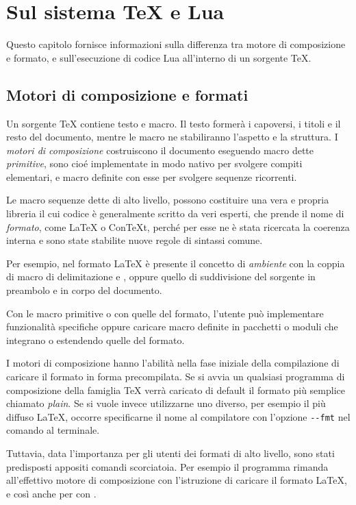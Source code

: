 

\chapter{Sul sistema \TeX{} e Lua}
\label{iichExplain}

Questo capitolo fornisce informazioni sulla differenza tra motore di
composizione e formato, e sull'esecuzione di codice Lua all'interno di un
sorgente \TeX.


\section{Motori di composizione e formati}

Un sorgente \TeX{} contiene testo e macro. Il testo formerà i capoversi, i
titoli e il resto del documento, mentre le macro ne stabiliranno l'aspetto e la
struttura. I \emph{motori di composizione} costruiscono il documento eseguendo
macro dette \emph{primitive}, sono cioé implementate in modo nativo per svolgere
compiti elementari, e macro definite con esse per svolgere sequenze ricorrenti.

Le macro sequenze dette di alto livello, possono costituire una vera e propria
libreria il cui codice è generalmente scritto da veri esperti, che prende il
nome di \emph{formato}, come \LaTeX{} o Con\TeX t, perché per esse ne è stata
ricercata la coerenza interna e sono state stabilite nuove regole di sintassi
comune.

Per esempio, nel formato \LaTeX{} è presente il concetto di \emph{ambiente} con
la coppia di macro di delimitazione  e , oppure quello
di suddivisione del sorgente in preambolo e in corpo del documento.

Con le macro primitive o con quelle del formato, l'utente può implementare
funzionalità specifiche oppure caricare macro definite in pacchetti o moduli che
integrano o estendendo quelle del formato.

I motori di composizione hanno l'abilità nella fase iniziale della compilazione
di caricare il formato in forma precompilata. Se si avvia un qualsiasi programma
di composizione della famiglia \TeX{} verrà caricato di default il formato più
semplice chiamato \emph{plain}. Se si vuole invece utilizzarne uno diverso, per
esempio il più diffuso \LaTeX{}, occorre specificarne il nome al compilatore con
l'opzione \texttt{-{}-fmt} nel comando al terminale.

Tuttavia, data l'importanza per gli utenti dei formati di alto livello, sono
stati predisposti appositi comandi scorciatoia. Per esempio il programma
 rimanda all'effettivo motore di composizione  con
l'istruzione di caricare il formato \LaTeX{}, e così anche per 
con .

